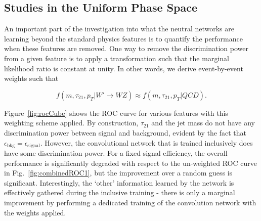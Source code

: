 \subsection{Studies in the Uniform Phase Space} %
\label{sub:flat_hypercube_studies}

An important part of the investigation into what the neutral networks are learning beyond the standard physics features is to quantify the performance when these features are removed.  One way to remove the discrimination power from a given feature is to apply a transformation such that the marginal likelihood ratio is constant at unity.  In other words, we derive event-by-event weights such that

\begin{equation}
\label{eq:flat}
  f(m, \tau_{21}, p_T| W'\rightarrow WZ) \approx f(m, \tau_{21}, p_T| QCD).
\end{equation}

Figure~\ref{fig:rocCube} shows the ROC curve for various features with this weighting scheme applied.  By construction, $\tau_{21}$ and the jet mass do not have any discrimination power between signal and background, evident by the fact that $\epsilon_\text{bkg}=\epsilon_\text{signal}$.    However, the convolutional network that is trained inclusively does have some discrimination power.  For a fixed signal efficiency, the overall performance is significantly degraded with respect to the un-weighted ROC curve in Fig.~\ref{fig:combinedROC1}, but the improvement over a random guess is significant.  Interestingly, the `other' information learned by the network is effectively gathered during the inclusive training - there is only a marginal improvement by performing a dedicated training of the convolution network with the weights applied.

